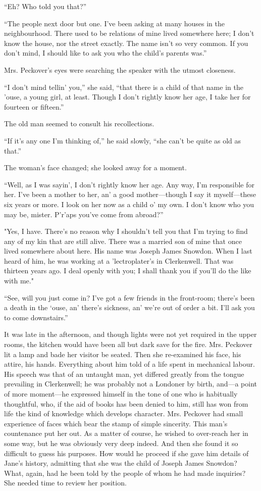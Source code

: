 ``Eh? Who told you that?''

``The people next door but one. I've been asking at many houses in the
neighbourhood. There used to be relations of mine lived somewhere here;
I don't know the house, nor the street exactly. The name isn't so very
common. If you don't mind, I should like to ask you who the child's
parents was.''

Mrs. Peckover's eyes were searching the speaker with the utmost
closeness.

{}``I don't mind tellin' you,'' she said, ``that there is a child of
that name in the 'ouse, a young girl, at least. Though I don't rightly
know her age, I take her for fourteen or fifteen.''

The old man seemed to consult his recollections.

``If it's any one I'm thinking of,'' he said slowly, ``she can't be
quite as old as that.''

The woman's face changed; she looked away for a moment.

``Well, as I was sayin', I don't rightly know her age. Any way, I'm
responsible for her. I've been a mother to her, an' a good
mother---though I say it myself---these six years or more. I look on her
now as a child o' my own. I don't know who you may be, mister. P'r'aps
you've come from abroad?''

"Yes, I have. There's no reason why I shouldn't tell you that I'm trying
to find any of my kin that are still alive. There was a married son of
mine that once lived somewhere about here. His name was Joseph James
Snowdon. When I last heard of him, {}he was working at a 'lectroplater's
in Clerkenwell. That was thirteen years ago. I deal openly with you; I
shall thank you if you'll do the like with me."

``See, will you just come in? I've got a few friends in the front-room;
there's been a death in the `ouse, an' there's sickness, an' we're out
of order a bit. I'll ask you to come downstairs.''

It was late in the afternoon, and though lights were not yet required in
the upper rooms, the kitchen would have been all but dark save for the
fire. Mrs. Peckover lit a lamp and bade her visitor be seated. Then she
re-examined his face, his attire, his hands. Everything about him told
of a life spent in mechanical labour. His speech was that of an untaught
man, yet differed greatly from the tongue prevailing in Clerkenwell; he
was probably not a Londoner by birth, and---a point of more moment---he
expressed himself in the tone of one who is habitually thoughtful, who,
if the aid of books has been denied to him, still has won from life
{}the kind of knowledge which develops character. Mrs. Peckover had
small experience of faces which bear the stamp of simple sincerity. This
man's countenance put her out. As a matter of course, he wished to
over-reach her in some way, but he was obviously very deep indeed. And
then she found it so difficult to guess his purposes. How would he
proceed if she gave him details of Jane's history, admitting that she
was the child of Joseph James Snowdon? What, again, had he been told by
the people of whom he had made inquiries? She needed time to review her
position.


